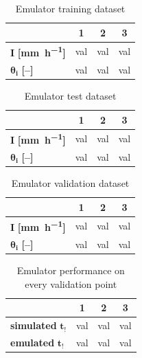 \begin{table}[H]
  \centering
  \caption{Emulator training dataset}
  \label{tab:training_dataset}
  \begin{tabular}{lccc}
    \toprule
     & \textbf{1} & \textbf{2} & \textbf{3}\\
    \midrule
    $\bm{I}$ \textbf{[\si{\milli\meter\per\hour}]} & val & val & val \\
    $\bm{\theta_i}$ \textbf{[--]} & val & val & val \\
    \bottomrule
  \end{tabular}
\end{table}


\begin{table}[H]
  \centering
  \caption{Emulator test dataset}
  \label{tab:test_dataset}
  \begin{tabular}{lccc}
    \toprule
     & \textbf{1} & \textbf{2} & \textbf{3}\\
    \midrule
    $\bm{I}$ \textbf{[\si{\milli\meter\per\hour}]} & val & val & val \\
    $\bm{\theta_i}$ \textbf{[--]} & val & val & val \\
    \bottomrule
  \end{tabular}
\end{table}


\begin{table}[H]
  \centering
  \caption{Emulator validation dataset}
  \label{tab:validation_dataset}
  \begin{tabular}{lccc}
    \toprule
     & \textbf{1} & \textbf{2} & \textbf{3}\\
    \midrule
    $\bm{I}$ \textbf{[\si{\milli\meter\per\hour}]} & val & val & val \\
    $\bm{\theta_i}$ \textbf{[--]} & val & val & val \\
    \bottomrule
  \end{tabular}
\end{table}


\begin{table}[H]
  \centering
  \caption{Emulator performance on every validation point}
  \label{tab:validation_performance}
  \begin{tabular}{lccc}
    \toprule
     & \textbf{1} & \textbf{2} & \textbf{3}\\
    \midrule
    \textbf{simulated} $\bm{t_!}$ & val & val & val \\
    \textbf{emulated} $\bm{t_!}$ & val & val & val \\
    \bottomrule
  \end{tabular}
\end{table}
